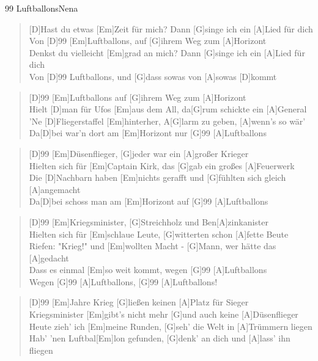 \begin{song}{99 Luftballons}{Nena}

    \begin{verse}  
        [D]Hast du etwas [Em]Zeit für mich? Dann [G]singe ich ein [A]Lied für dich\\
        Von [D]99 [Em]Luftballons, auf [G]ihrem Weg zum [A]Horizont\\
        [D]Denkst du vielleicht [Em]grad an mich? Dann [G]singe ich ein [A]Lied für dich\\
        Von [D]99 Luftballons, und [G]dass sowas von [A]sowas [D]kommt
    \end{verse}  

    \begin{verse}  
        [D]99 [Em]Luftballons auf [G]ihrem Weg zum [A]Horizont \\
        Hielt [D]man für Ufos [Em]aus dem All, da[G]rum schickte ein [A]General \\
        'Ne [D]Fliegerstaffel [Em]hinterher, A[G]larm zu geben, [A]wenn's so wär' \\
        Da[D]bei war'n dort am [Em]Horizont nur [G]99 [A]Luftballons
    \end{verse}  

    \begin{verse}  
        [D]99 [Em]Düsenflieger, [G]jeder war ein [A]großer Krieger \\
        [D]Hielten sich für [Em]Captain Kirk, das [G]gab ein großes [A]Feuerwerk \\
        Die [D]Nachbarn haben [Em]nichts gerafft und [G]fühlten sich gleich [A]angemacht \\
        Da[D]bei schoss man am [Em]Horizont auf [G]99 [A]Luftballons
    \end{verse}  

    \begin{verse}  
        [D]99 [Em]Kriegsminister, [G]Streichholz und Ben[A]zinkanister \\
        [D]Hielten sich für [Em]schlaue Leute, [G]witterten schon [A]fette Beute \\
        [D]Riefen: "Krieg!" und [Em]wollten Macht - [G]Mann, wer hätte das [A]gedacht \\
        [D]Dass es einmal [Em]so weit kommt, wegen [G]99 [A]Luftballons \\
        Wegen [G]99 [A]Luftballons, [G]99 [A]Luftballons!
    \end{verse}  

    \begin{verse}  
        [D]99 [Em]Jahre Krieg [G]ließen keinen [A]Platz für Sieger \\
        [D]Kriegsminister [Em]gibt's nicht mehr [G]und auch keine [A]Düsenflieger \\
        [D]Heute zieh' ich [Em]meine Runden, [G]seh' die Welt in [A]Trümmern liegen \\
        [D]Hab' 'nen Luftbal[Em]lon gefunden, [G]denk' an dich und [A]lass' ihn fliegen
    \end{verse}  

\end{song}
